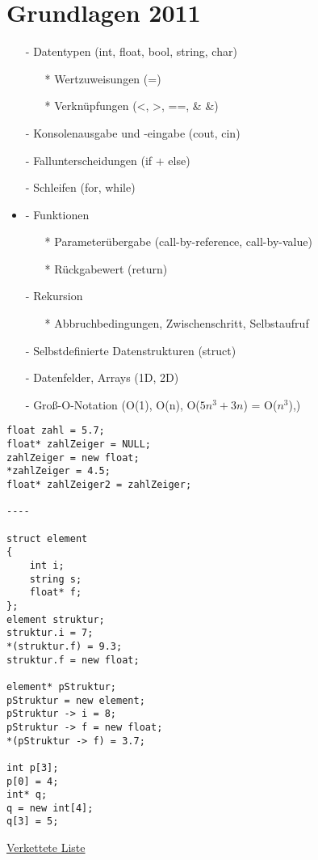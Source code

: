 \section{Grundlagen 2011}
\begin{itemize}
    \item[-] Datentypen (int, float, bool, string, char)
    \begin{itemize}
        \item[*] Wertzuweisungen (=)
        \item[*] Verknüpfungen (<, >, ==, \& \&)
    \end{itemize}
    \item[-] Konsolenausgabe und -eingabe (cout, cin)
    \item[-] Fallunterscheidungen (if + else)
    \item[-] Schleifen (for, while)
    \item{-} Funktionen
    \begin{itemize}
        \item[*] Parameterübergabe (call-by-reference, call-by-value)
        \item[*] Rückgabewert (return)
    \end{itemize}
    \item[-] Rekursion
    \begin{itemize}
        \item[*] Abbruchbedingungen, Zwischenschritt, Selbstaufruf
    \end{itemize}
    \item[-] Selbstdefinierte Datenstrukturen (struct)
    \item[-] Datenfelder, Arrays (1D, 2D)
    \item[-] Groß-O-Notation (O(1), O(n), O($5n^3 + 3n$) = O($n^3$),)
\end{itemize}
\begin{lstlisting}
float zahl = 5.7;
float* zahlZeiger = NULL;
zahlZeiger = new float;
*zahlZeiger = 4.5;
float* zahlZeiger2 = zahlZeiger;

----

struct element
{
    int i;
    string s;
    float* f;
};
element struktur;
struktur.i = 7;
*(struktur.f) = 9.3;
struktur.f = new float;

element* pStruktur;
pStruktur = new element;
pStruktur -> i = 8;
pStruktur -> f = new float;
*(pStruktur -> f) = 3.7;

int p[3];
p[0] = 4;
int* q;
q = new int[4];
q[3] = 5;
\end{lstlisting}
\underline{Verkettete Liste} \\
